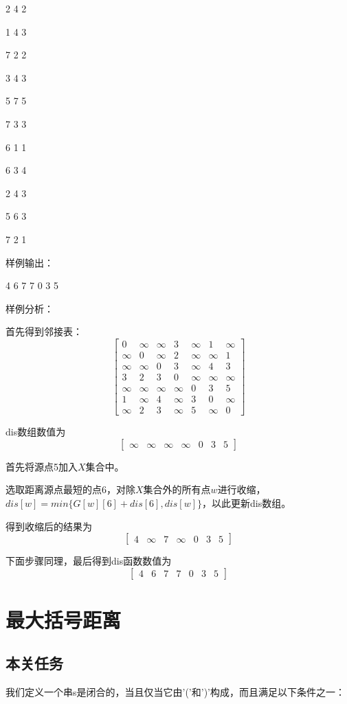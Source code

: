 \documentclass[UTF8,a4paperdui, %
]{ctexart}
\begin{document}
2 4 2

1 4 3

7 2 2

3 4 3

5 7 5

7 3 3

6 1 1

6 3 4

2 4 3

5 6 3

7 2 1

样例输出：

4 6 7 7 0 3 5 

样例分析：

首先得到邻接表：
\[
\left[
    \begin{array}{ccccccc}
        0 & \infty & \infty & 3 & \infty & 1 & \infty \\
        \infty & 0 & \infty & 2 & \infty & \infty & 1 \\
        \infty & \infty & 0 & 3 & \infty & 4 & 3 \\
        3 & 2 & 3 & 0 & \infty & \infty & \infty \\
        \infty & \infty & \infty & \infty & 0 & 3 & 5 \\
        1 & \infty & 4 & \infty & 3 & 0 & \infty \\
        \infty & 2 & 3 & \infty & 5 & \infty & 0
    \end{array}
\right]
\]

dis数组数值为
\[
\left[
	\begin{array}{ccccccc}
		\infty & \infty & \infty & \infty & 0 & 3 & 5
	\end{array}
\right]
\]

首先将源点5加入$X$集合中。

选取距离源点最短的点6，对除$X$集合外的所有点$w$进行收缩，$dis[w]=min\{G[w][6]+dis[6],dis[w]\}$，以此更新dis数组。

得到收缩后的结果为
\[
\left[
	\begin{array}{ccccccc}
		4 & \infty & 7 & \infty & 0 & 3 & 5
	\end{array}
\right]
\]

下面步骤同理，最后得到dis函数数值为
\[
\left[
	\begin{array}{ccccccc}
		4 & 6 & 7 & 7 & 0 & 3 & 5
	\end{array}
\right]
\]
\section{最大括号距离}
\subsection{本关任务}
我们定义一个串s是闭合的，当且仅当它由'('和')'构成，而且满足以下条件之一：
\end{document}

